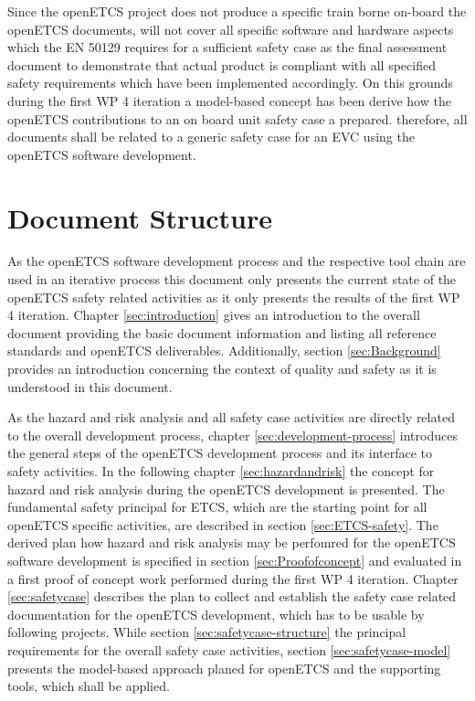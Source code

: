 \documentclass{template/openetcs_report}
\begin{document}
Since the openETCS project does not produce a specific train borne on-board the openETCS documents, will not cover all specific software and hardware aspects which the EN 50129 requires for a sufficient safety case as the final assessment document to demonstrate that actual product is compliant with all specified safety requirements which have been implemented accordingly. On this grounds during the first WP 4 iteration a model-based concept has been derive how the openETCS contributions to an on board unit safety case a prepared. therefore, all documents shall be related to a generic safety case for an EVC using the openETCS software development.

\section{Document Structure}
\label{sec:document-structure}

As the openETCS software development process and the respective tool chain are used in an iterative process this document only presents the current state of the openETCS safety related activities as it only presents the results of the first WP 4 iteration. Chapter \ref{sec:introduction} gives an introduction to the overall document providing the basic document information and listing all reference standards and openETCS deliverables. Additionally, section \ref{sec:Background} provides an introduction concerning the context of quality and safety as it is understood in this document.

As the hazard and risk analysis and all safety case activities are directly related to the overall development process, chapter \ref{sec:development-process} introduces the general steps of the openETCS development process and its interface to safety activities. In the following chapter \ref{sec:hazardandrisk} the concept for hazard and risk analysis during the openETCS development is presented. The fundamental safety principal for ETCS, which are the starting point for all openETCS specific activities, are described in section \ref{sec:ETCS-safety}.
The derived plan how hazard and risk analysis may be perfomred for the openETCS software development is specified in section \ref{sec:Proofofconcept} and evaluated in a first proof of concept work performed during the first WP 4 iteration. Chapter \ref{sec:safetycase} describes the plan to collect and establish the safety case related documentation for the openETCS development, which has to be usable by following projects. While section \ref{sec:safetycase-structure} the principal requirements for the overall safety case activities, section \ref{sec:safetycase-model} presents the model-based approach planed for openETCS and the supporting tools, which shall be applied.
\end{document}
